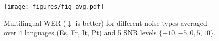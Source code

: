 \begin{figure}[t]
    \centering
    \texttt{[image: figures/fig\_avg.pdf]}
    \vspace{-2em}
    \caption{Multilingual WER ($\downarrow$ is better) for different noise types averaged over 4 languages (Es, Fr, It, Pt) and 5 SNR levels $\{-10,-5,0,5,10 \}$.}
    \label{fig:noise}
    \vspace{-0.5cm}
\end{figure}